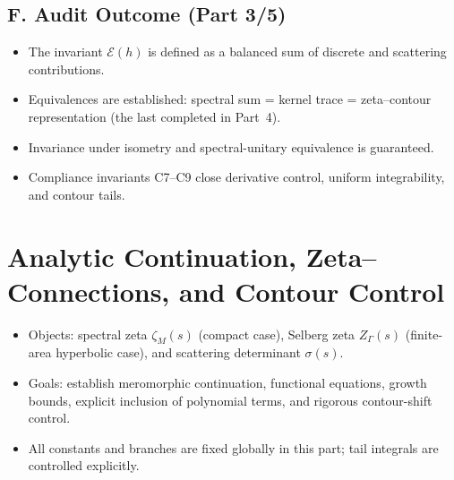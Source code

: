 \subsection*{F. Audit Outcome (Part 3/5)}
\label{subsec:audit-outcome-part3}

\begin{tcolorbox}[colback=gray!3,colframe=gray!65,title=Audit outcome — Part 3/5]
\begin{itemize}
  \item The invariant $\mathcal E(h)$ is defined as a balanced sum of discrete and scattering contributions.
  \item Equivalences are established: spectral sum = kernel trace = zeta–contour representation (the last completed in Part~4).
  \item Invariance under isometry and spectral-unitary equivalence is guaranteed.
  \item Compliance invariants C7–C9 close derivative control, uniform integrability, and contour tails.
\end{itemize}
\end{tcolorbox}


\section{Analytic Continuation, Zeta–Connections, and Contour Control}
\label{sec:analytic-continuation}

\begin{tcolorbox}[colback=gray!5,colframe=gray!55,
  title=Scope and Assumptions (Part 4/5)]
\begin{itemize}
  \item Objects: spectral zeta $\zeta_M(s)$ (compact case), Selberg zeta $Z_\Gamma(s)$ (finite-area hyperbolic case), and scattering determinant $\sigma(s)$.
  \item Goals: establish meromorphic continuation, functional equations, growth bounds, explicit inclusion of polynomial terms, and rigorous contour-shift control.
  \item All constants and branches are fixed globally in this part; tail integrals are controlled explicitly.
\end{itemize}
\end{tcolorbox}

